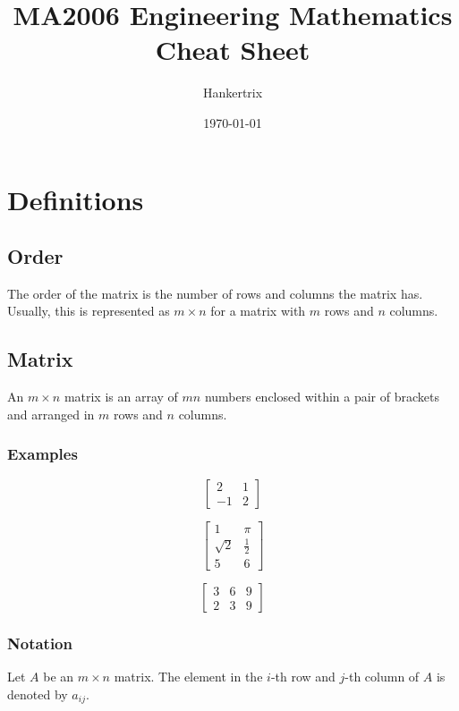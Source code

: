 \documentclass[11pt]{article}
\author{Hankertrix}
\date{\today}
\title{MA2006 Engineering Mathematics Cheat Sheet}
\begin{document}
\maketitle
\setcounter{tocdepth}{2}
\tableofcontents \clearpage
\section{Definitions}
\label{sec:org4e9dd57}

\subsection{Order}
\label{sec:orga11318e}
The order of the matrix is the number of rows and columns the matrix has. Usually, this is represented as \(m \times n\) for a matrix with \(m\) rows and \(n\) columns.

\subsection{Matrix}
\label{sec:orgd74e0cc}
An \(m \times n\) matrix is an array of \(mn\) numbers enclosed within a pair of brackets and arranged in \(m\) rows and \(n\) columns.

\subsubsection{Examples}
\label{sec:orgbc0be89}
\begin{displaymath}
\begin{bmatrix}
2 & 1 \\
-1 & 2
\end{bmatrix}
\end{displaymath}

\begin{displaymath}
\begin{bmatrix}
1 & \pi \\
\sqrt{2} & \frac{1}{2} \\
5 & 6
\end{bmatrix}
\end{displaymath}

\begin{displaymath}
\begin{bmatrix}
3 & 6 & 9 \\
2 & 3 & 9
\end{bmatrix}
\end{displaymath}


\subsubsection{Notation}
\label{sec:org1be0712}
Let \(A\) be an \(m \times n\) matrix. The element in the \(i\)-th row and \(j\)-th column of \(A\) is denoted by \(a_{ij}\).
\end{document}
